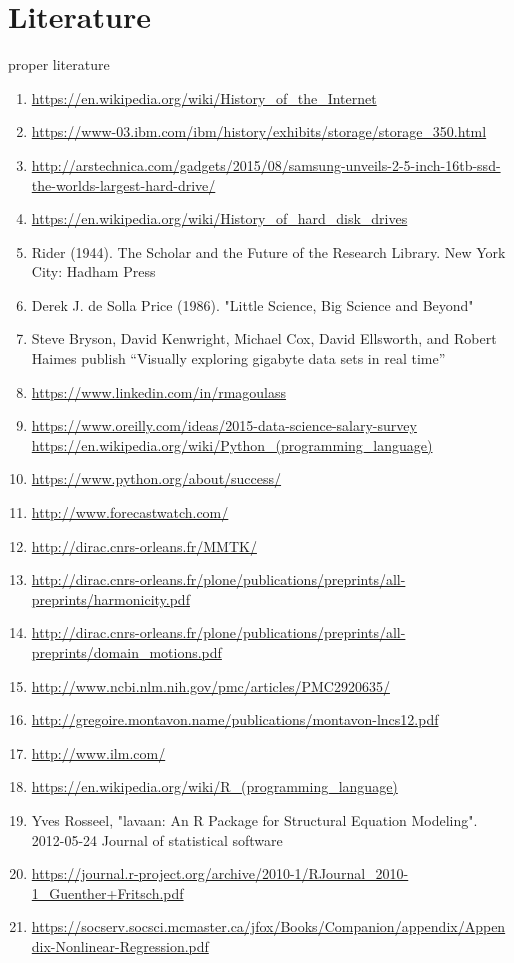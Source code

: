 \documentclass [twoside,
  11pt, a4paper,
  footinclude=true,
  headinclude=true,
  cleardoublepage=empty
]{article}
\begin{document}
\section{Literature}
proper literature
\begin{enumerate}
    \item \url{https://en.wikipedia.org/wiki/History_of_the_Internet} 
    \item \url{https://www-03.ibm.com/ibm/history/exhibits/storage/storage_350.html}
    \item \url{http://arstechnica.com/gadgets/2015/08/samsung-unveils-2-5-inch-16tb-ssd-the-worlds-largest-hard-drive/}
    \item \url{https://en.wikipedia.org/wiki/History_of_hard_disk_drives}
    \item Rider (1944). The Scholar and the Future of the Research Library. New York City: Hadham Press
    \item Derek J. de Solla Price (1986). "Little Science, Big Science and Beyond"
    \item  Steve Bryson, David Kenwright, Michael Cox, David Ellsworth, and Robert Haimes publish “Visually exploring gigabyte data sets in real time”
    \item \url{https://www.linkedin.com/in/rmagoulass}
    \item \url{https://www.oreilly.com/ideas/2015-data-science-salary-survey}
    \ietm \url{https://en.wikipedia.org/wiki/Python_(programming_language)}
    \item \url{https://www.python.org/about/success/}
    \item \url{http://www.forecastwatch.com/}
    \item \url{http://dirac.cnrs-orleans.fr/MMTK/}
    \item \url{http://dirac.cnrs-orleans.fr/plone/publications/preprints/all-preprints/harmonicity.pdf}
    \item \url{http://dirac.cnrs-orleans.fr/plone/publications/preprints/all-preprints/domain_motions.pdf}
    \item \url{http://www.ncbi.nlm.nih.gov/pmc/articles/PMC2920635/}
    \item \url{http://gregoire.montavon.name/publications/montavon-lncs12.pdf}
    \item \url{http://www.ilm.com/}
    \item \url{https://en.wikipedia.org/wiki/R_(programming_language)}
    \item Yves Rosseel, "lavaan: An R Package for Structural Equation Modeling". 2012-05-24 Journal of statistical software
    \item \url{https://journal.r-project.org/archive/2010-1/RJournal_2010-1_Guenther+Fritsch.pdf}
    \item \url{https://socserv.socsci.mcmaster.ca/jfox/Books/Companion/appendix/Appendix-Nonlinear-Regression.pdf} 
    
\end{enumerate}
\end{document}
